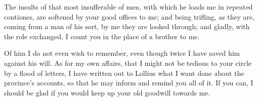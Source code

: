 

 The insults of that most insufferable of men, with which he loads me in repeated contiones, are softened by your good offices to me; and being trifling, as they are, coming from a man of his sort, by me they are looked through; and gladly, with the role exchanged, I count you in the place of a brother to me.

 Of him I do not even wish to remember, even though twice I have saved him against his will. As for my own affairs, that I might not be tedious to your circle by a flood of letters, I have written out to Lollius what I want done about the province's accounts, so that he may inform and remind you all of it. If you can, I should be glad if you would keep up your old goodwill towards me.
